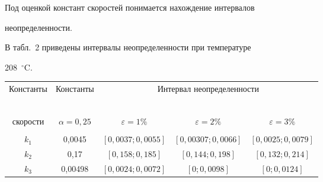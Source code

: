 Под оценкой констант скоростей понимается нахождение интервалов 

неопределенности.

  

  В табл.~2 приведены интервалы неопределенности при температуре 

208~$^\circ$C.

  

\begin{table}\small %

\begin{center}


\vspace*{2ex}



\begin{tabular}{|c|c|c|c|c|}

\hline

Константы &

Константы &

\multicolumn{3}{c|}{Интервал неопределенности }\\

\cline{3-5}

&&&&\\[-9pt]

\multicolumn{2}{c}{\ } &&&\\[-10pt]

скорости&$\alpha=0{,}25$& $\varepsilon=1\%$&$\varepsilon=2\%$ &

$\varepsilon=3\%$\\

\hline

&&&&\\[-9pt]

$k_1$&0,0045&$[0{,}0037; 0{,}0055]$ &$[0{,}00307; 0{,}0066]$ &   $[0{,}0025; 

0{,}0079]$\\

$k_2$ &0,17\hphantom{99} &$[0{,}158; 0{,}185]$ &

\hphantom{9}$[0{,}144; 0{,}198]$ &$[0{,}132; 

0{,}214]$\\

$k_3$ &\hphantom{9}0,00498 &$[0{,}0024; 0{,}0072]$ & 

\hphantom{99999,}$[0; 0{,}0098]$ & \hphantom{9,999}$[0; 

0{,}0124]$\\


\end{tabular}
\end{center}
\end{table}
